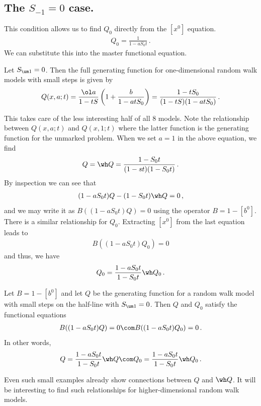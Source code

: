 \subsection{The $S_{-1} = 0$ case.}
This condition allows us to find $Q_0$ directly from the $[x^0]$ equation.
\begin{align}
	Q_0 = \frac{1}{1-aS_0t}\,.
\end{align}
We can substitute this into the master functional equation.
\begin{prop} Let $S_{\um 1} = 0$. Then the full generating function for one-dimensional random walk models with small steps is given by
\begin{align}
	Q(x,a;t) =\frac{\ol a}{1-tS}\left(1 + \frac{b}{{1-atS_0}}\right) = \frac{1-tS_0}{(1-tS)(1-atS_0)}\,.
\end{align}
\end{prop}
This takes care of the less interesting half of all 8 models. Note the relationship between $Q(x,a;t)$ and $Q(x,1;t)$ where the latter function is the generating function for the unmarked problem. When we set $a = 1$ in the above equation, we find
\begin{align}
	[b^0]Q = \wh Q =  \frac{1-S_0t}{(1-st)(1-S_0t)}\,.
\end{align}
By inspection we can see that
\begin{align}
	(1-aS_0t)Q-(1-S_0t)\wh Q = 0\,,
\end{align}
and we may write it as $B((1-aS_0t)Q)  = 0$ using the operator $B = 1- [b^0]$. There is a similar relationship for $Q_0$. Extracting $[x^0]$ from the last equation leads to
\begin{align}
	B((1-aS_0t)Q_0) = 0
\end{align}
and thus, we have
\begin{align}
	Q_0 = \frac{1-aS_0t}{1-S_0t}\wh Q_0\,.
\end{align}
\begin{prop} Let $B = 1 - [b^0]$ and let $Q$ be the generating function for a random walk model with small steps on the half-line with $S_{\um 1} = 0$. Then $Q$ and $Q_0$ satisfy the functional equations
\begin{align}
	B((1-aS_0t)Q) = 0\com B((1-aS_0t)Q_0) = 0\,.
\end{align}
In other words,
\begin{align}
	Q = \frac{1-aS_0t}{1-S_0t}\wh Q\com Q_0 = \frac{1-aS_0t}{1-S_0t}\wh Q_0\,.
\end{align}
\end{prop}
Even such small examples already show connections between $Q$ and $\wh Q$. It will be interesting to find such relationships for higher-dimensional random walk models.
